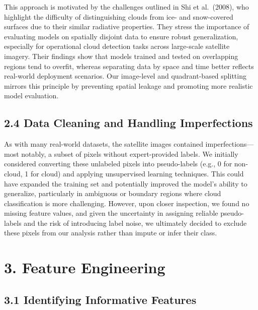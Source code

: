\documentclass[11pt]{article}
\begin{document}
This approach is motivated by the challenges outlined in Shi et
al.~(2008), who highlight the difficulty of distinguishing clouds from
ice- and snow-covered surfaces due to their similar radiative
properties. They stress the importance of evaluating models on spatially
disjoint data to ensure robust generalization, especially for
operational cloud detection tasks across large-scale satellite imagery.
Their findings show that models trained and tested on overlapping
regions tend to overfit, whereas separating data by space and time
better reflects real-world deployment scenarios. Our image-level and
quadrant-based splitting mirrors this principle by preventing spatial
leakage and promoting more realistic model evaluation.

    \subsection*{2.4 Data Cleaning and Handling
Imperfections}\label{data-cleaning-and-handling-imperfections}

As with many real-world datasets, the satellite images contained
imperfections---most notably, a subset of pixels without expert-provided
labels. We initially considered converting these unlabeled pixels into
pseudo-labels (e.g., 0 for non-cloud, 1 for cloud) and applying
unsupervised learning techniques. This could have expanded the training
set and potentially improved the model's ability to generalize,
particularly in ambiguous or boundary regions where cloud classification
is more challenging. However, upon closer inspection, we found no
missing feature values, and given the uncertainty in assigning reliable
pseudo-labels and the risk of introducing label noise, we ultimately
decided to exclude these pixels from our analysis rather than impute or
infer their class.

\section*{3. Feature Engineering}\label{feature-engineering}

\subsection*{3.1 Identifying Informative
Features}\label{identifying-informative-features}
\end{document}

